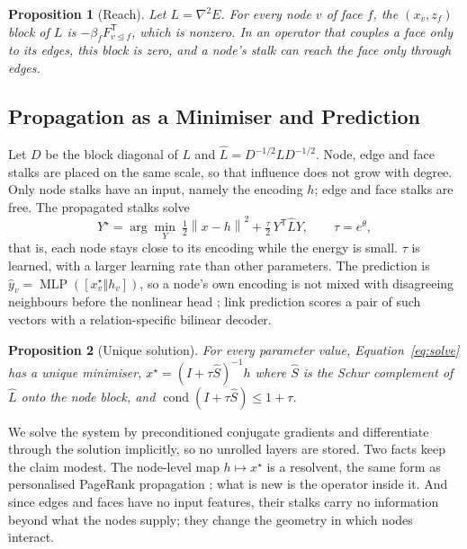 \documentclass{article}
\newtheorem{proposition}{Proposition}
\newcommand{\norm}[1]{\left\lVert #1\right\rVert}
\newcommand{\transpose}{\mathsf{T}}
\newcommand{\concat}{\mathbin\Vert}
\newcommand{\inc}{\trianglelefteq}
\begin{document}
\begin{proposition}[Reach]\label{prop:reach}
Let $L=\nabla^2E$. For every node $v$ of face $f$, the $(x_v,z_f)$ block of $L$ is $-\beta_fF_{v\inc f}^{\transpose}$, which is nonzero. In an operator that couples a face only to its edges, this block is zero, and a node's stalk can reach the face only through edges.
\end{proposition}

\subsection{Propagation as a Minimiser and Prediction}
\label{sec:prop}
Let $D$ be the block diagonal of $L$ and $\hat L=D^{-1/2}LD^{-1/2}$. Node, edge and face stalks are placed on the same scale, so that influence does not grow with degree. Only node stalks have an input, namely the encoding $h$; edge and face stalks are free. The propagated stalks solve
\begin{equation}
  Y^\star=\arg\min_Y\ \tfrac12\norm{x-h}^2+\tfrac{\tau}{2}\,Y^{\transpose}\hat LY,\qquad \tau=e^{\theta},
  \label{eq:solve}
\end{equation}
that is, each node stays close to its encoding while the energy is small. $\tau$ is learned, with a larger learning rate than other parameters. The prediction is $\hat y_v=\operatorname{MLP}([x^\star_v\concat h_v])$, so a node's own encoding is not mixed with disagreeing neighbours before the nonlinear head \cite{zhu2020beyond}; link prediction scores a pair of such vectors with a relation-specific bilinear decoder.

\begin{proposition}[Unique solution]\label{prop:unique}
For every parameter value, Equation~\eqref{eq:solve} has a unique minimiser, $x^\star=(I+\tau\hat S)^{-1}h$ where $\hat S$ is the Schur complement of $\hat L$ onto the node block, and $\operatorname{cond}(I+\tau\hat S)\le1+\tau$.
\end{proposition}
We solve the system by preconditioned conjugate gradients and differentiate through the solution implicitly, so no unrolled layers are stored. Two facts keep the claim modest. The node-level map $h\mapsto x^\star$ is a resolvent, the same form as personalised PageRank propagation \cite{gasteiger2019appnp}; what is new is the operator inside it. And since edges and faces have no input features, their stalks carry no information beyond what the nodes supply; they change the geometry in which nodes interact.
\end{document}
